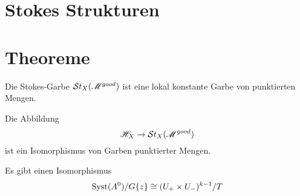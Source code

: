 \section{Stokes Strukturen} %
\section{Theoreme} %
\begin{thm}
  Die Stokes-Garbe $\mathcal{S}{}t_X(\mathscr{M}^{good})$ ist eine lokal konstante Garbe von
  punktierten Mengen.
\end{thm}
\begin{thm}
  Die Abbildung
  \[
    \mathscr{H}_X\to\mathcal{S}{}t_X(\mathscr{M}^{good})
  \]
  ist ein Isomorphismus von Garben punktierter Mengen.
\end{thm}

\begin{thm}
  Es gibt einen Isomorphismus
  \[
    \operatorname{Syst}(A^0)/G\{z\}\cong(U_+\times U_-)^{k-1}/T
  \]
\end{thm}
